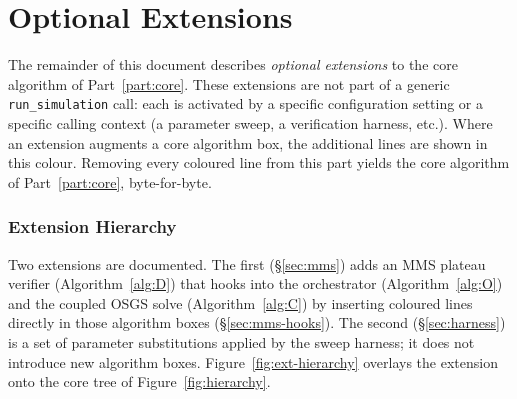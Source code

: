 \documentclass{article}
\newcommand{\code}[1]{\texttt{\small #1}}
\newcommand{\extline}[1]{{\color{extcolor}#1}}
\begin{document}
\part{Optional Extensions}
\label{part:ext}

\begin{tcolorbox}[colback=extcolor!5!white, colframe=extcolor, boxrule=0.5pt, arc=2pt, left=6pt, right=6pt, top=4pt, bottom=4pt]
\small
\extline{The remainder of this document describes \emph{optional extensions}
to the core algorithm of Part~\ref{part:core}. These extensions are not
part of a generic \code{run\_simulation} call: each is activated by a
specific configuration setting or a specific calling context (a
parameter sweep, a verification harness, etc.). Where an extension
augments a core algorithm box, the additional lines are shown in this
colour. Removing every \extline{coloured} line from this part yields
the core algorithm of Part~\ref{part:core}, byte-for-byte.}
\end{tcolorbox}

\section{Extension Hierarchy}

Two extensions are documented. The first
(§\ref{sec:mms}) adds an MMS plateau verifier (Algorithm~\ref{alg:D})
that hooks into the orchestrator (Algorithm~\ref{alg:O}) and the coupled
OSGS solve (Algorithm~\ref{alg:C}) by inserting coloured \extline{\extline{}}
lines directly in those algorithm boxes (§\ref{sec:mms-hooks}). The
second (§\ref{sec:harness}) is a set of parameter substitutions applied
by the sweep harness; it does not introduce new algorithm boxes.
Figure~\ref{fig:ext-hierarchy} overlays the extension onto the core
tree of Figure~\ref{fig:hierarchy}.
\end{document}
